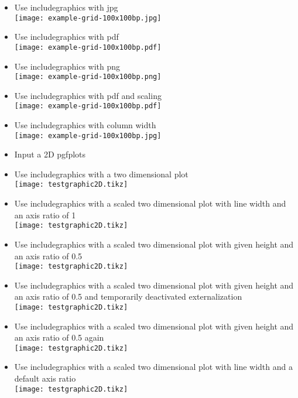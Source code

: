 \documentclass[twocolumn]{article}
\providecommand\tikzexternalenable{}
\providecommand\tikzexternaldisable{}
\begin{document}
\begin{itemize}
			\item Use includegraphics with jpg\\%
				\texttt{[image: example-grid-100x100bp.jpg]}%
			\item Use includegraphics with pdf\\%
				\texttt{[image: example-grid-100x100bp.pdf]}%
			\item Use includegraphics with png\\%
				\texttt{[image: example-grid-100x100bp.png]}%
			\item Use includegraphics with pdf and scaling\\%
				\texttt{[image: example-grid-100x100bp.pdf]}%
			\item Use includegraphics with column width\\%
				\texttt{[image: example-grid-100x100bp.jpg]}%
			\item Input a 2D pgfplots\\
			\item Use includegraphics with a two dimensional plot\\%
				\texttt{[image: testgraphic2D.tikz]}%
			\item Use includegraphics with a scaled two dimensional plot with line width and an axis ratio of 1\\%
				\texttt{[image: testgraphic2D.tikz]}%
			\item Use includegraphics with a scaled two dimensional plot with given height and an axis ratio of 0.5\\%
				\texttt{[image: testgraphic2D.tikz]}%
			\item Use includegraphics with a scaled two dimensional plot with given height and an axis ratio of 0.5 and temporarily deactivated externalization\\%
				\tikzexternaldisable
				\texttt{[image: testgraphic2D.tikz]}%
				\tikzexternalenable
			\item Use includegraphics with a scaled two dimensional plot with given height and an axis ratio of 0.5 again\\%
				\texttt{[image: testgraphic2D.tikz]}%
			\item Use includegraphics with a scaled two dimensional plot with line width and a default axis ratio\\%
				\texttt{[image: testgraphic2D.tikz]}%

\end{itemize}
\end{document}
